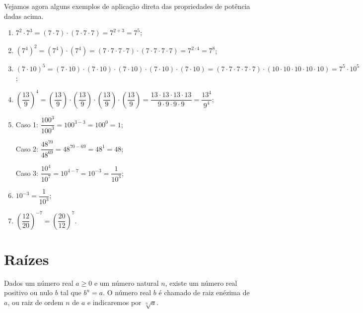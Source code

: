  \begin{exem} Vejamos agora alguns exemplos de aplicação direta das propriedades de potência dadas acima.
  \begin{enumerate}[P1)]
   \item $7^2 \cdot 7^3= (7 \cdot 7) \cdot (7 \cdot 7 \cdot 7)= 7^{2+3}= 7^5 $;
   \item $(7^4)^2= (7^4) \cdot (7^4)= (7 \cdot 7 \cdot 7 \cdot 7) \cdot (7 \cdot 7 \cdot 7 \cdot 7)= 7^{2 \cdot 4}= 7^8$;
   \item $(7 \cdot 10)^5= (7 \cdot 10) \cdot (7 \cdot 10) \cdot (7 \cdot 10) \cdot (7 \cdot 10) \cdot (7 \cdot 10)= (7 \cdot 7 \cdot 7 \cdot 7 \cdot 7) \cdot (10 \cdot 10 \cdot 10 \cdot 10 \cdot 10)= 7^5 \cdot 10^5$;
   \item $\left(\dfrac{13}{9}\right)^4= \left(\dfrac{13}{9}\right) \cdot \left(\dfrac{13}{9}\right) \cdot \left(\dfrac{13}{9}\right) \cdot \left(\dfrac{13}{9}\right)= \dfrac{13 \cdot 13 \cdot 13 \cdot 13}{9 \cdot 9 \cdot 9 \cdot 9}= \dfrac{13^4}{9^4}$;
   \item Caso 1: $\dfrac{100^3}{100^3}= 100^{3-3}= 100^0= 1$;

   Caso 2: $\dfrac{48^{70}}{48^{69}}= 48^{70-69}= 48^{1}= 48$;

   Caso 3: $\dfrac{10^4}{10^7}= 10^{4-7}= 10^{-3} =\dfrac{1}{10^{3}}$;

   \item $10^{-3}= \dfrac{1}{10^3}$;
   \item $\left(\dfrac{12}{20}\right)^{-7}=\left(\dfrac{20}{12}\right)^{7}$.

  \end{enumerate}

 \end{exem}


 \section{Raízes}

 \vskip0.3cm

 \colorbox{azul}{
 \begin{minipage}{0.9\linewidth}
 \begin{center}
  Dados um número real $a \geq 0$ e um número natural $n$, existe um número real positivo ou nulo $b$ tal que $b^n= a$. O número real $b$ é chamado de raiz enézima de $a$, ou raiz de ordem $n$ de $a$ e indicaremos por $\sqrt[n]{a}$.
 \end{center}
 \end{minipage}}

